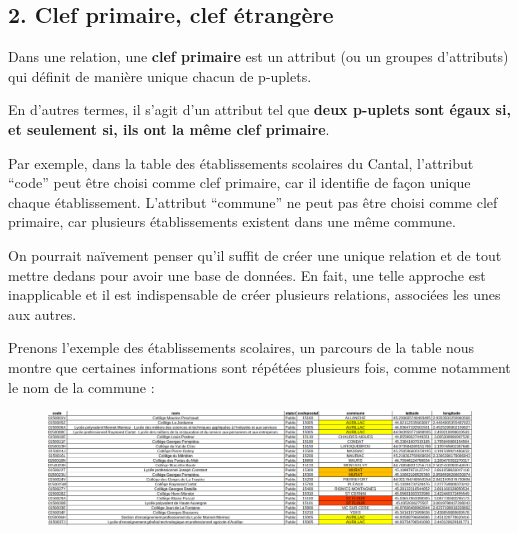\documentclass[
  letterpaper,
  DIV=11,
  numbers=noendperiod]{scrartcl}
\begin{document}
\hypertarget{clef-primaire-clef-uxe9tranguxe8re}{%
\subsection{2. Clef primaire, clef
étrangère}\label{clef-primaire-clef-uxe9tranguxe8re}}

\begin{tcolorbox}[enhanced jigsaw, opacityback=0, bottomrule=.15mm, left=2mm, colframe=quarto-callout-tip-color-frame, arc=.35mm, toprule=.15mm, title=\textcolor{quarto-callout-tip-color}{\faLightbulb}\hspace{0.5em}{Définition}, titlerule=0mm, breakable, colback=white, opacitybacktitle=0.6, bottomtitle=1mm, colbacktitle=quarto-callout-tip-color!10!white, rightrule=.15mm, toptitle=1mm, coltitle=black, leftrule=.75mm]

Dans une relation, une \textbf{clef primaire} est un attribut (ou un
groupes d'attributs) qui définit de manière unique chacun de p-uplets.

\end{tcolorbox}

En d'autres termes, il s'agit d'un attribut tel que \textbf{deux
p-uplets sont égaux si, et seulement si, ils ont la même clef primaire}.

Par exemple, dans la table des établissements scolaires du Cantal,
l'attribut ``code'' peut être choisi comme clef primaire, car il
identifie de façon unique chaque établissement. L'attribut ``commune''
ne peut pas être choisi comme clef primaire, car plusieurs
établissements existent dans une même commune.

On pourrait naïvement penser qu'il suffit de créer une unique relation
et de tout mettre dedans pour avoir une base de données. En fait, une
telle approche est inapplicable et il est indispensable de créer
plusieurs relations, associées les unes aux autres.

Prenons l'exemple des établissements scolaires, un parcours de la table
nous montre que certaines informations sont répétées plusieurs fois,
comme notamment le nom de la commune :

\begin{figure}

{\centering \includegraphics{BDD6.png}

}

\end{figure}
\end{document}
